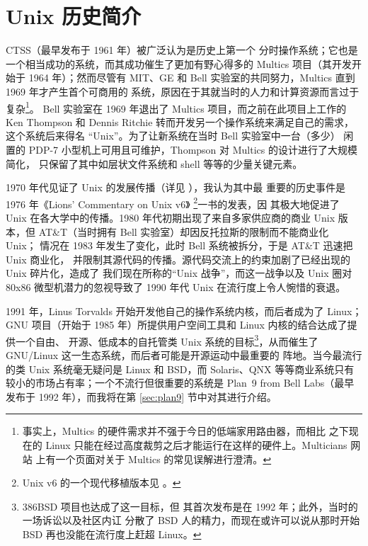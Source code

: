 \newpart
\section{Unix 历史简介}\label{sec:intro}

CTSS（最早发布于 1961 年）被广泛认为是历史上第一个
分时操作系统；它也是一个相当成功的系统，而其成功催生了更加有野心得多的
Multics 项目（其开发开始于 1964 年）；然而尽管有
MIT、GE 和 Bell 实验室的共同努力，Multics 直到 1969 年才产生首个可商用的
系统，原因在于其就当时的人力和计算资源而言过于
复杂\footnote{事实上，Multics 的硬件需求并不强于今日的低端家用路由器，而相比
之下现在的 Linux 只能在经过高度裁剪之后才能运行在这样的硬件上。Multicians 网站
上有一个页面对关于 Multics 的常见误解进行澄清。}。
Bell 实验室在 1969 年退出了 Multics 项目，而之前在此项目上工作的 Ken Thompson
和 Dennis Ritchie 转而开发另一个操作系统来满足自己的需求，这个系统后来得名
“Unix”。为了让新系统在当时 Bell 实验室中一台（多少）
闲置的 PDP-7 小型机上可用且可维护，Thompson 对 Multics 的设计进行了大规模简化，
只保留了其中如层状文件系统和 shell 等等的少量关键元素。

1970 年代见证了 Unix 的发展传播（详见 \parencite{wiki:unixhist}），我认为其中最
重要的历史事件是 1976 年《Lions' Commentary on Unix v6》%
\footnote{Unix v6 的一个现代移植版本见 \parencite{wiki:xv6}。}一书的发表，因
其极大地促进了 Unix 在各大学中的传播。1980 年代初期出现了来自多家供应商的商业
Unix 版本，但 AT\&T（当时拥有 Bell 实验室）却因反托拉斯的限制而不能商业化 Unix；
情况在 1983 年发生了变化，此时 Bell 系统被拆分，于是 AT\&T 迅速把 Unix 商业化，
并限制其源代码的传播。源代码交流上的约束加剧了已经出现的 Unix 碎片化，造成了
我们现在所称的“Unix 战争”，而这一战争以及 Unix 圈对
80x86 微型机潜力的忽视导致了 1990 年代 Unix 在流行度上令人惋惜的衰退。

1991 年，Linus Torvalds 开始开发他自己的操作系统内核，而后者成为了 Linux；GNU
项目（开始于 1985 年）所提供用户空间工具和 Linux 内核的结合达成了提供一个自由、
开源、低成本的自托管类 Unix 系统的目标\footnote{386BSD 项目也达成了这一目标，但
其首次发布是在 1992 年；此外，当时的一场诉讼以及社区内讧%
分散了 BSD 人的精力，而现在或许可以说从那时开始 BSD 再也没能在流行度上赶超
Linux。}，从而催生了 GNU/Linux 这一生态系统，而后者可能是开源运动中最重要的
阵地。当今最流行的类 Unix 系统毫无疑问是 Linux 和 BSD，而 Solaris、QNX
等等商业系统只有较小的市场占有率；一个不流行但很重要的系统是 Plan~9 from
Bell Labs（最早发布于 1992 年），而我将在第 \ref{sec:plan9} 节中对其进行介绍。

